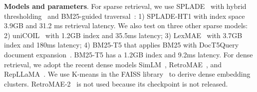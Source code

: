 {\bf Models and parameters}.
For sparse retrieval, we use
SPLADE~\cite{Formal2021SPLADE,Formal_etal_SIGIR2022_splade++,Lassance2022SPLADE-efficient} 
with hybrid thresholding~\cite{2023SIGIR-Qiao} and  BM25-guided traversal~\cite{mallia2022faster,qiao2023optimizing}:
1) SPLADE-HT1 with index space 3.9GB and 31.2 ms retrieval latency.
We also test on three other sparse models:
2) uniCOIL~\cite{ Lin2021unicoil,2021NAACL-Gao-COIL} with 1.2GB index and 35.5ms latency;
3) LexMAE~\cite{shen2023lexmae} with 3.7GB index and 180ms latency;
4) BM25-T5 that applies  BM25 with  DocT5Query document expansion~\cite{Cheriton2019doct5query}.  
BM25-T5 has a 1.2GB index and 9.2ms latency. 
For dense retrieval, we adopt the recent dense models
SimLM~\cite{Wang2022SimLM}, RetroMAE~\cite{Liu2022RetroMAE}, and
RepLLaMA~\cite{ma2023finetuning}. 
We use  K-means in the FAISS library~\cite{johnson2019billion} to derive dense embedding clusters.
RetroMAE-2~\cite{liu-etal-2023-retromae} is not used because its checkpoint is not released.


